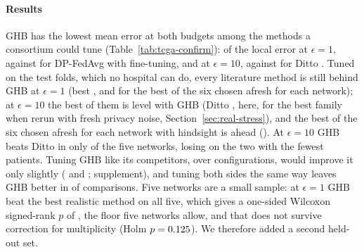 \begin{table}[t]
\caption{Five TCGA networks held out from GHB's development (hospitals: BRCA 8, MESO 9, OV 15, UCEC 15, UCS 5): held-out log-loss relative to local estimation under the default prior (ten repetitions of five-fold cross-validation). GHB and GHB-lite have nothing to tune. Every literature method uses the configuration that is best on the twelve development networks, fixed before these runs. Bold: the lowest per network among methods that use other hospitals, oracle excluded. Wins: networks in which GHB is more accurate. $\ddagger$: no other hospital. $\star$: for each network, the best configuration of the best of the six methods on that network's own held-out folds, which no hospital can do.}
\label{tab:tcga-confirm}
\scriptsize
\setlength{\tabcolsep}{4pt}
\end{table}

\paragraph{Results} GHB has the lowest mean error at both budgets among the methods a consortium could tune (Table~\ref{tab:tcga-confirm}): \SimTCOneGHB{} of the local error at $\epsilon=1$, against \SimTCOneFT{} for DP-FedAvg \cite{mcmahan2018learning} with fine-tuning, and \SimTCTenGHB{} at $\epsilon=10$, against \SimTCTenDitto{} for Ditto \cite{li2021ditto}. Tuned on the test folds, which no hospital can do, every literature method is still behind GHB at $\epsilon=1$ (best \SimTCOneFTOrc, and \SimTCOneBestOrc{} for the best of the six chosen afresh for each network); at $\epsilon=10$ the best of them is level with GHB (Ditto \cite{li2021ditto}, \SimTCTenDittoOrc{} here, \SimStressStdTenOrc{} for the best family when rerun with fresh privacy noise, Section~\ref{sec:real-stress}), and the best of the six chosen afresh for each network with hindsight is ahead (\SimTCTenBestOrc). At $\epsilon=10$ GHB beats Ditto \cite{li2021ditto} in only \SimTCTenDittoWins{} of the five networks, losing on the two with the fewest patients. Tuning GHB like its competitors, over \SimTuneConfigs{} configurations, would improve it only slightly (\SimTuneOneDev{} and \SimTuneTenDev{}; supplement), and tuning both sides the same way leaves GHB better in \SimStTunedWins{} of \SimStTunedPairs{} comparisons. Five networks are a small sample: at $\epsilon=1$ GHB beat the best realistic method on all five, which gives a one-sided Wilcoxon signed-rank $p$ of \SimStTOneRealP{} \cite{wilcoxon1945individual}, the floor five networks allow, and that does not survive correction for multiplicity (Holm \cite{holm1979simple} $p=0.125$). We therefore added a second held-out set.

